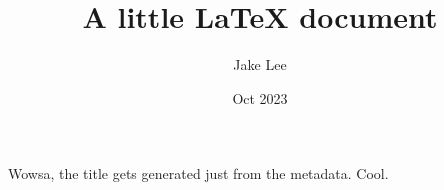 \documentclass[12pt, letterpaper]{article}
\title{A little LaTeX document}
\author{Jake Lee}
\date{Oct 2023}
\begin{document}
\maketitle

Wowsa, the title gets generated just from the metadata. Cool.
\end{document}
